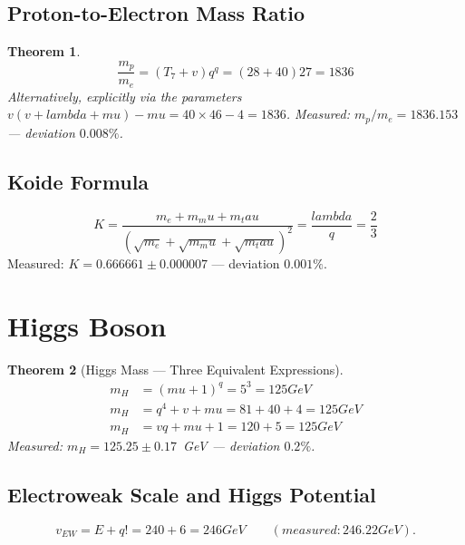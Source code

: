 \documentclass[12pt,a4paper]{article}
\def\mathrm#1{#1}%
\def\text#1{#1}%
\def\lambda{lambda}%
\def\mu{mu}%
\def\tau{tau}%
\def\cdot{ }%
\newtheorem{theorem}{Theorem}[section]
\theoremstyle{definition}
\newcommand{\vEW}{v_{\mathrm{EW}}}
\begin{document}
\subsection{Proton-to-Electron Mass Ratio}

\begin{theorem}
\begin{equation}
\boxed{\frac{m_p}{m_e} = (T_7 + v) \cdot q^q = (28+40)\cdot 27 = 1836}
\label{eq:proton-electron}
\end{equation}
Alternatively, explicitly via the parameters $v(v+\lambda+\mu)-\mu = 40\times 46 - 4 = 1836$.
Measured: $m_p/m_e = 1836.153$ --- deviation $0.008\%$.
\end{theorem}


\subsection{Koide Formula}

\begin{equation}
K = \frac{m_e+m_\mu+m_\tau}
{(\sqrt{m_e}+\sqrt{m_\mu}+\sqrt{m_\tau})^2}
= \frac{\lambda}{q} = \frac{2}{3}
\end{equation}
Measured: $K=0.666661\pm 0.000007$ --- deviation $0.001\%$.


\section{Higgs Boson}
\label{sec:higgs}

\begin{theorem}[Higgs Mass --- Three Equivalent Expressions]
\begin{align}
m_H &= (\mu+1)^q = 5^3 = 125\text{ GeV} \label{eq:higgs1}\\
m_H &= q^4+v+\mu = 81+40+4 = 125\text{ GeV} \label{eq:higgs2}\\
m_H &= vq+\mu+1 = 120+5 = 125\text{ GeV} \label{eq:higgs3}
\end{align}
Measured: $m_H = 125.25\pm 0.17$~GeV --- deviation $0.2\%$.
\end{theorem}

\subsection{Electroweak Scale and Higgs Potential}

\begin{equation}
\vEW = E+q! = 240+6 = 246\text{ GeV}
\qquad(\text{measured: }246.22\text{ GeV}).
\end{equation}
\end{document}
